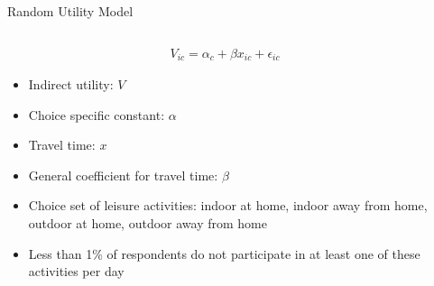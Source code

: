 \documentclass[notes,11pt, aspectratio=169]{beamer}
\begin{document}

\begin{frame}{Random Utility Model}

\begin{columns}[T] %
\begin{column}{.9\textwidth}

  \begin{align}
    V_{ic} = \alpha_c + \beta x_{ic} + \epsilon_{ic}
  \end{align}
  
\begin{itemize}
    \item Indirect utility: $V$
    \item Choice specific constant: $\alpha$
    \item Travel time: $x$
    \item General coefficient for travel time: $\beta$
    \item Choice set of leisure activities: indoor at home, indoor away from home, outdoor at home, outdoor away from home
    \item Less than 1\% of respondents do not participate in at least one of these activities per day 
\end{itemize}





\end{column}%
\hfill%
\begin{column}{.38\textwidth}
  \makebox[\linewidth][c]{
    \resizebox{\linewidth}{!}{
    }
  }
\end{column}%
\end{columns}
\end{frame}

\end{document}
